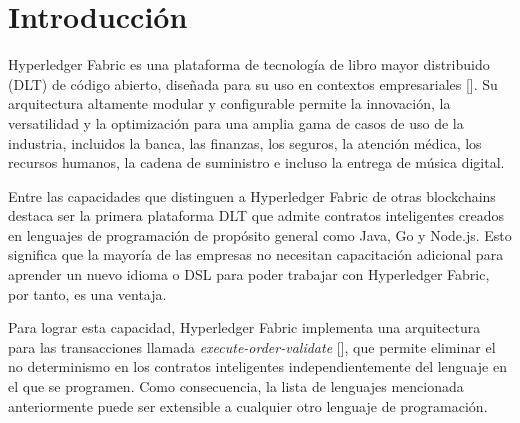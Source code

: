 \chapter*{Introducción}\label{chapter:introduction}

Hyperledger Fabric es una plataforma de tecnología de libro mayor distribuido (DLT) de código abierto, diseñada para su uso en contextos empresariales [\cite{hlf-doc}]. Su arquitectura altamente modular y configurable permite la innovación, la versatilidad y la optimización para una amplia gama de casos de uso de la industria, incluidos la banca, las finanzas, los seguros, la atención médica, los recursos humanos, la cadena de suministro e incluso la entrega de música digital.

Entre las capacidades que distinguen a Hyperledger Fabric de otras blockchains destaca ser la primera plataforma DLT que admite contratos inteligentes creados en lenguajes de programación de propósito general como Java, Go y Node.js.
Esto significa que la mayoría de las empresas no necesitan capacitación adicional para aprender un nuevo idioma o DSL para poder trabajar con Hyperledger Fabric, por tanto, es una ventaja.

Para lograr esta capacidad, Hyperledger Fabric implementa una arquitectura para las transacciones llamada \textit{execute-order-validate} [\cite{hlf-paper}], que permite eliminar el no determinismo en los contratos inteligentes independientemente del lenguaje en el que se programen. Como consecuencia, la lista de lenguajes mencionada anteriormente puede ser extensible a cualquier otro lenguaje de programación. 




